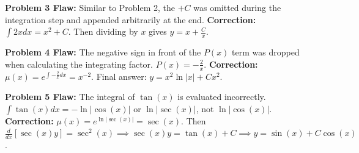\documentclass[11pt]{article}
\begin{document}
\textbf{Problem 3 Flaw:} Similar to Problem 2, the $+C$ was omitted during the integration step and appended arbitrarily at the end.
\textbf{Correction:} $\int 2x dx = x^2 + C$. Then dividing by $x$ gives $y = x + \frac{C}{x}$. 

\textbf{Problem 4 Flaw:} The negative sign in front of the $P(x)$ term was dropped when calculating the integrating factor. $P(x) = -\frac{2}{x}$.
\textbf{Correction:} $\mu(x) = e^{\int -\frac{2}{x} dx} = x^{-2}$. Final answer: $y = x^2 \ln|x| + Cx^2$.

\textbf{Problem 5 Flaw:} The integral of $\tan(x)$ is evaluated incorrectly. $\int \tan(x) dx = -\ln|\cos(x)|$ or $\ln|\sec(x)|$, not $\ln|\cos(x)|$.
\textbf{Correction:} $\mu(x) = e^{\ln|\sec(x)|} = \sec(x)$. Then $\frac{d}{dx}[\sec(x)y] = \sec^2(x) \implies \sec(x)y = \tan(x) + C \implies y = \sin(x) + C\cos(x)$.
\end{document}
